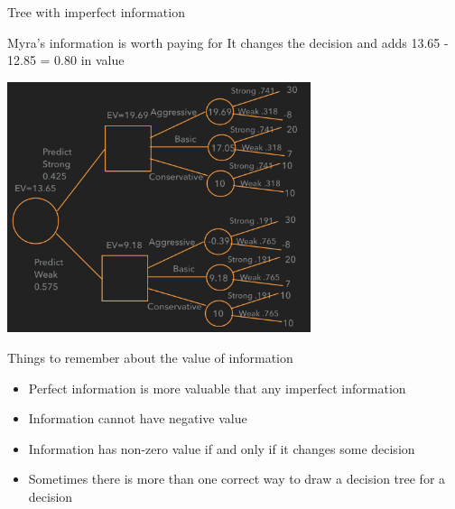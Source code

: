 \documentclass{beamer}\usepackage[]{graphicx}\usepackage[]{color}
\begin{document}
\begin{darkframes}
\begin{frame}[fragile]{Tree with imperfect information}
    \end{frame}


    \begin{frame}[fragile]{Myra's information is worth paying for}
       It changes the decision and adds 13.65 - 12.85 = 0.80 in value 
      \begin{center}
        \includegraphics[width=3.5in]{BevoImperfect} \\
      \end{center}

    \end{frame}


    \begin{frame}[fragile]{Things to remember about the value of information}
          \begin{itemize} [<+->]
            \item Perfect information is more valuable that any imperfect information
            \item Information cannot have negative value
            \item Information has non-zero value if and only if it changes some decision
            \item Sometimes there is more than one correct way to draw a decision tree for a decision
          \end{itemize}   
    \end{frame}

  \end{darkframes}
\end{document}
